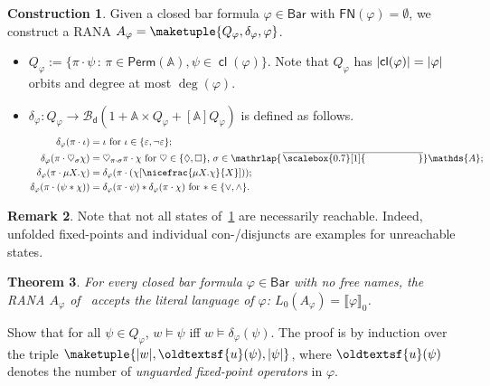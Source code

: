 \documentclass[10pt,a4paper]{amsart}
\newtheorem{theo}{Theorem}[section]
\theoremstyle{definition}
\newtheorem{rem}[theo]{Remark}
\newtheorem{construction}[theo]{Construction}
\renewcommand{\textsf}[1]{{\oldtextsf{\small#1}}}
\newcommand{\At}{\mathds{A}}
\newcommand{\sem}[1]{\llbracket #1 \rrbracket}
\newcommand{\op}[1]{\operatorname{\mathsf{#1}}}
\newcommand{\cl}{\op{cl}}
\newcommand{\card}[1]{\left\vert#1\right\vert}
\newcommand{\allbool}{\mathcal{B}}
\newcommand{\dualbool}{\allbool_\mathsf{d}}
\newcommand{\Perm}{\mathsf{Perm}}
\newcommand{\names}{\At}
\newcommand{\Abstr}[2][\names]{[#1]#2}
\newcommand{\set}[1]{\{#1\}}
\newcommand{\setw}[2]{\{#1\,:\,#2\}}
\newcommand{\mybar}[3]{%
  \mathrlap{\hspace{#2}\overline{\scalebox{#1}[1]{\phantom{\ensuremath{#3}}}}}\ensuremath{#3}
}
\newcommand{\FN}{\mathsf{FN}}
\newcommand{\BarForm}{\mathsf{Bar}}
\newcommand{\barNames}{{\mybar{0.7}{1.25pt}{\names}}}
\renewcommand{\vDash}{\models}
\let\originalleft\left
\let\originalright\right
\renewcommand{\left}{\mathopen{}\mathclose\bgroup\originalleft}
\renewcommand{\right}{\aftergroup\egroup\originalright}
\begin{document}
\begin{construction}\label{constr:formaut}
  Given a closed bar formula $\varphi \in \BarForm$ with $\FN(\varphi) = \emptyset$, we
  construct a RANA $A_\varphi = \maketuple{Q_\varphi,\delta_\varphi,\varphi}$.
  \begin{itemize}
    \item $Q_\varphi := \setw{\pi \cdot \psi}{\pi \in \Perm(\names), \psi \in \cl(\varphi)}$. Note that
      $Q_\varphi$ has $\card{\cl(\varphi)} = \card{\varphi}$ orbits and  degree at most
      $\deg(\varphi)$.
    \item $\delta_\varphi\colon Q_\varphi \to \dualbool(1 + \names \times Q_\varphi + \Abstr{Q_\varphi})$
      is defined as follows.
      \begin{align*}
        \delta_\varphi(\pi \cdot \iota)
        &= \iota\ \text{for $\iota \in \set{\varepsilon, \neg\varepsilon}$}; \\
        \delta_\varphi(\pi \cdot \heartsuit_\sigma \chi)
        &= \heartsuit_{\pi\cdot\sigma} \pi \cdot \chi\
        \text{for $\heartsuit \in \set{\Diamond, \Box}$, $\sigma \in \barNames$}; \\
        \delta_\varphi(\pi \cdot \mu X.\chi)
        &= \delta_\varphi(\pi \cdot (\chi[\nicefrac{\mu X.\chi}{X}])); \\
        \delta_\varphi(\pi \cdot (\psi \ast \chi))
        &= \delta_\varphi(\pi \cdot \psi) \ast \delta_\varphi(\pi \cdot \chi)\ \text{for $\ast \in \set{\vee, \wedge}$}.
    \end{align*}
  \end{itemize}
\end{construction}

\begin{rem}\label{rem:formautconstr}
  Note that not all states of~\cref{constr:formaut} are necessarily reachable. Indeed, unfolded fixed-points and
  individual con-/disjuncts are examples for unreachable states.
\end{rem}


\begin{theo}\label{theo:corrFormAut}
  For every closed bar formula $\varphi \in \BarForm$ with no free names, the RANA $A_\varphi$ of~
  accepts the literal language of $\varphi$: $L_0(A_\varphi) = \sem{\varphi}_0$.
\end{theo}

\begin{IEEEproof}
  Show that for all $\psi \in Q_\varphi$,
  $w \vDash \psi$ iff $w \vDash \delta_\varphi(\psi)$. The proof
  is by induction over the triple $\maketuple{\card{w}, \textsf{u}(\psi),
  \card{\psi}}$, where $\textsf{u}(\psi)$ denotes the number of \emph{unguarded fixed-point operators} in
  $\varphi$.

\end{IEEEproof}
\end{document}
